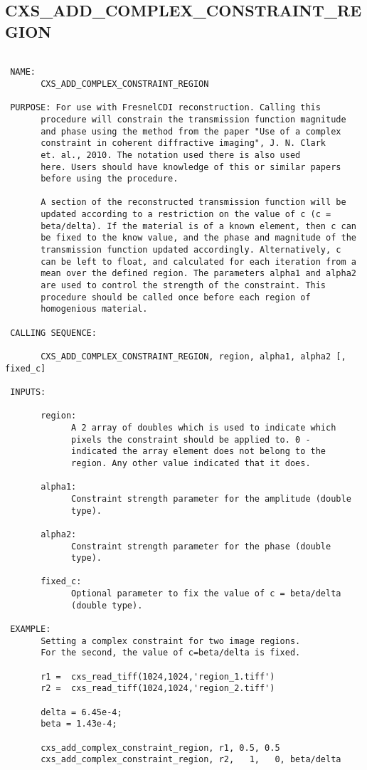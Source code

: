 
\subsection{CXS\_ADD\_COMPLEX\_CONSTRAINT\_REGION}
\begin{verbatim}

 NAME:
       CXS_ADD_COMPLEX_CONSTRAINT_REGION

 PURPOSE: For use with FresnelCDI reconstruction. Calling this
       procedure will constrain the transmission function magnitude
       and phase using the method from the paper "Use of a complex
       constraint in coherent diffractive imaging", J. N. Clark
       et. al., 2010. The notation used there is also used
       here. Users should have knowledge of this or similar papers
       before using the procedure.

       A section of the reconstructed transmission function will be
       updated according to a restriction on the value of c (c =
       beta/delta). If the material is of a known element, then c can
       be fixed to the know value, and the phase and magnitude of the
       transmission function updated accordingly. Alternatively, c
       can be left to float, and calculated for each iteration from a
       mean over the defined region. The parameters alpha1 and alpha2
       are used to control the strength of the constraint. This
       procedure should be called once before each region of
       homogenious material.

 CALLING SEQUENCE:

       CXS_ADD_COMPLEX_CONSTRAINT_REGION, region, alpha1, alpha2 [, fixed_c]

 INPUTS:

       region:
             A 2 array of doubles which is used to indicate which
             pixels the constraint should be applied to. 0 -
             indicated the array element does not belong to the
             region. Any other value indicated that it does.

       alpha1:
             Constraint strength parameter for the amplitude (double
             type).

       alpha2:
             Constraint strength parameter for the phase (double
             type).
             
       fixed_c:
             Optional parameter to fix the value of c = beta/delta
             (double type).

 EXAMPLE:
       Setting a complex constraint for two image regions.
       For the second, the value of c=beta/delta is fixed.

       r1 =  cxs_read_tiff(1024,1024,'region_1.tiff')
       r2 =  cxs_read_tiff(1024,1024,'region_2.tiff')

       delta = 6.45e-4;
       beta = 1.43e-4;

       cxs_add_complex_constraint_region, r1, 0.5, 0.5
       cxs_add_complex_constraint_region, r2,   1,   0, beta/delta

\end{verbatim}



